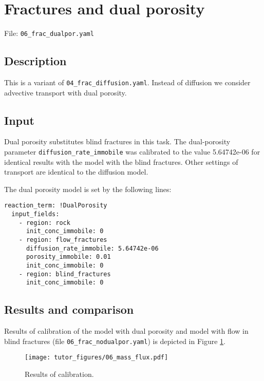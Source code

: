 \section{Fractures and dual porosity}

File: \texttt{06\_frac\_dualpor.yaml}

\subsection{Description}

This is a variant of \texttt{04\_frac\_diffusion.yaml}. Instead of
diffusion we consider advective transport with dual porosity.

\subsection{Input}

Dual porosity substitutes blind fractures in this task. The
dual-porosity parameter \texttt{diffusion\_rate\_immobile} was
calibrated to the value 5.64742e-06 for identical results with the model
with the blind fractures. Other settings of transport are identical to
the diffusion model.

The dual porosity model is set by the following lines:

\begin{verbatim}
reaction_term: !DualPorosity
  input_fields:
    - region: rock
      init_conc_immobile: 0
    - region: flow_fractures
      diffusion_rate_immobile: 5.64742e-06
      porosity_immobile: 0.01
      init_conc_immobile: 0
    - region: blind_fractures
      init_conc_immobile: 0
\end{verbatim}

\subsection{Results and comparison}

Results of calibration of the model with dual porosity and model with
flow in blind fractures (file \texttt{06\_frac\_nodualpor.yaml}) is
depicted in Figure \ref{fig:calib}.

\begin{figure}[htbp]
\centering
\texttt{[image: tutor\_figures/06\_mass\_flux.pdf]}
\caption{Results of calibration.\label{fig:calib}}
\end{figure}
